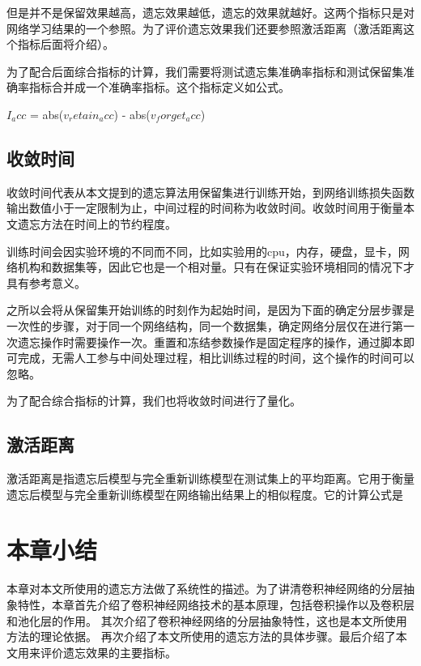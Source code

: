 但是并不是保留效果越高，遗忘效果越低，遗忘的效果就越好。这两个指标只是对网络学习结果的一个参照。为了评价遗忘效果我们还要参照激活距离（激活距离这个指标后面将介绍）。

为了配合后面综合指标的计算，我们需要将测试遗忘集准确率指标和测试保留集准确率指标合并成一个准确率指标。这个指标定义如公式。

$I_acc$ = abs($v_retain_acc$) - abs($v_forget_acc$)
\subsection{收敛时间}

收敛时间代表从本文提到的遗忘算法用保留集进行训练开始，到网络训练损失函数输出数值小于一定限制为止，中间过程的时间称为收敛时间。收敛时间用于衡量本文遗忘方法在时间上的节约程度。

训练时间会因实验环境的不同而不同，比如实验用的cpu，内存，硬盘，显卡，网络机构和数据集等，因此它也是一个相对量。只有在保证实验环境相同的情况下才具有参考意义。

之所以会将从保留集开始训练的时刻作为起始时间，是因为下面的确定分层步骤是一次性的步骤，对于同一个网络结构，同一个数据集，确定网络分层仅在进行第一次遗忘操作时需要操作一次。重置和冻结参数操作是固定程序的操作，通过脚本即可完成，无需人工参与中间处理过程，相比训练过程的时间，这个操作的时间可以忽略。

为了配合综合指标的计算，我们也将收敛时间进行了量化。

\subsection{激活距离}

激活距离是指遗忘后模型与完全重新训练模型在测试集上的平均距离。它用于衡量遗忘后模型与完全重新训练模型在网络输出结果上的相似程度。它的计算公式是
% 

\section{本章小结}
本章对本文所使用的遗忘方法做了系统性的描述。为了讲清卷积神经网络的分层抽象特性，本章首先介绍了卷积神经网络技术的基本原理，包括卷积操作以及卷积层和池化层的作用。
其次介绍了卷积神经网络的分层抽象特性，这也是本文所使用方法的理论依据。
再次介绍了本文所使用的遗忘方法的具体步骤。最后介绍了本文用来评价遗忘效果的主要指标。
